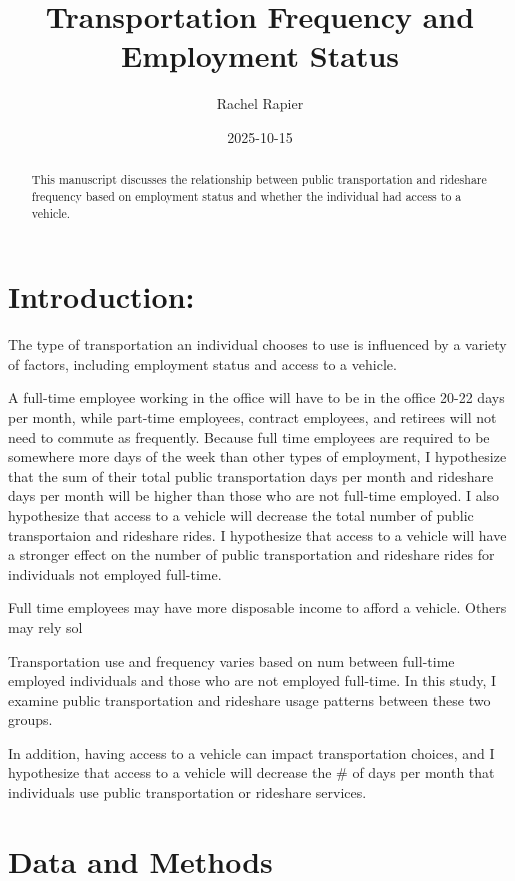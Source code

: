 \documentclass[
  letterpaper,
  DIV=11,
  numbers=noendperiod]{scrartcl}
\title{Transportation Frequency and Employment Status}
\author{Rachel Rapier}
\date{2025-10-15}
\renewcommand*\contentsname{Table of contents}
\newcommand\contentsname{Table of contents}
\begin{document}
\maketitle
\begin{abstract}
This manuscript discusses the relationship between public transportation
and rideshare frequency based on employment status and whether the
individual had access to a vehicle.
\end{abstract}

\renewcommand*\contentsname{Table of contents}
{
\setcounter{tocdepth}{3}
\tableofcontents
}

\section{Introduction:}\label{introduction}

The type of transportation an individual chooses to use is influenced by
a variety of factors, including employment status and access to a
vehicle.

A full-time employee working in the office will have to be in the office
20-22 days per month, while part-time employees, contract employees, and
retirees will not need to commute as frequently. Because full time
employees are required to be somewhere more days of the week than other
types of employment, I hypothesize that the sum of their total public
transportation days per month and rideshare days per month will be
higher than those who are not full-time employed. I also hypothesize
that access to a vehicle will decrease the total number of public
transportaion and rideshare rides. I hypothesize that access to a
vehicle will have a stronger effect on the number of public
transportation and rideshare rides for individuals not employed
full-time.

Full time employees may have more disposable income to afford a vehicle.
Others may rely sol

Transportation use and frequency varies based on num between full-time
employed individuals and those who are not employed full-time. In this
study, I examine public transportation and rideshare usage patterns
between these two groups.

In addition, having access to a vehicle can impact transportation
choices, and I hypothesize that access to a vehicle will decrease the \#
of days per month that individuals use public transportation or
rideshare services.

\section{Data and Methods}\label{data-and-methods}
\end{document}
